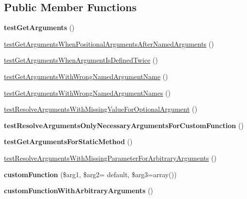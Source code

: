 \subsection*{Public Member Functions}
\begin{DoxyCompactItemize}
\item 
{\bfseries test\+Get\+Arguments} ()\hypertarget{classTwig__Tests__Node__Expression__CallTest_a13f41517e65a3154b400e24322530acf}{}\label{classTwig__Tests__Node__Expression__CallTest_a13f41517e65a3154b400e24322530acf}

\item 
\hyperlink{classTwig__Tests__Node__Expression__CallTest_ab242b1ef755a75cda47bee69b5395d5b}{test\+Get\+Arguments\+When\+Positional\+Arguments\+After\+Named\+Arguments} ()
\item 
\hyperlink{classTwig__Tests__Node__Expression__CallTest_ae0c3cfc8460922bc85b0073b52cd44a6}{test\+Get\+Arguments\+When\+Argument\+Is\+Defined\+Twice} ()
\item 
\hyperlink{classTwig__Tests__Node__Expression__CallTest_afa66eaa48255ce1f96cac44e609a28ae}{test\+Get\+Arguments\+With\+Wrong\+Named\+Argument\+Name} ()
\item 
\hyperlink{classTwig__Tests__Node__Expression__CallTest_a7f86420d0cc23db98e0d708c26a558fc}{test\+Get\+Arguments\+With\+Wrong\+Named\+Argument\+Names} ()
\item 
\hyperlink{classTwig__Tests__Node__Expression__CallTest_a1f12093f86b47a928d4ef4187a28f2a5}{test\+Resolve\+Arguments\+With\+Missing\+Value\+For\+Optional\+Argument} ()
\item 
{\bfseries test\+Resolve\+Arguments\+Only\+Necessary\+Arguments\+For\+Custom\+Function} ()\hypertarget{classTwig__Tests__Node__Expression__CallTest_a6b17a5b0ce7e4e1e75bd9c6909ecc896}{}\label{classTwig__Tests__Node__Expression__CallTest_a6b17a5b0ce7e4e1e75bd9c6909ecc896}

\item 
{\bfseries test\+Get\+Arguments\+For\+Static\+Method} ()\hypertarget{classTwig__Tests__Node__Expression__CallTest_a6d58d1d15c27cf6788b9009dda40f740}{}\label{classTwig__Tests__Node__Expression__CallTest_a6d58d1d15c27cf6788b9009dda40f740}

\item 
\hyperlink{classTwig__Tests__Node__Expression__CallTest_a2f0738bc79161d6d7f7a77ecc1298d8b}{test\+Resolve\+Arguments\+With\+Missing\+Parameter\+For\+Arbitrary\+Arguments} ()
\item 
{\bfseries custom\+Function} (\$arg1, \$arg2= \textquotesingle{}default\textquotesingle{}, \$arg3=array())\hypertarget{classTwig__Tests__Node__Expression__CallTest_ade55fabac9c57d7c6adb60a5a4aa6304}{}\label{classTwig__Tests__Node__Expression__CallTest_ade55fabac9c57d7c6adb60a5a4aa6304}

\item 
{\bfseries custom\+Function\+With\+Arbitrary\+Arguments} ()\hypertarget{classTwig__Tests__Node__Expression__CallTest_a059d915d8942afe86560121ddfe69dc8}{}\label{classTwig__Tests__Node__Expression__CallTest_a059d915d8942afe86560121ddfe69dc8}

\end{DoxyCompactItemize}
